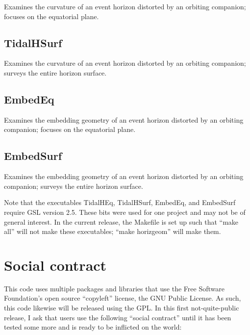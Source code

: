 \documentclass[11pt]{article}
\begin{document}
Examines the curvature of an event horizon distorted by an orbiting companion; focuses on the equatorial plane.

\subsection{TidalHSurf}

Examines the curvature of an event horizon distorted by an orbiting companion; surveys the entire horizon surface.

\subsection{EmbedEq}

Examines the embedding geometry of an event horizon distorted by an orbiting companion; focuses on the equatorial plane.

\subsection{EmbedSurf}

Examines the embedding geometry of an event horizon distorted by an orbiting companion; surveys the entire horizon surface.

Note that the executables TidalHEq, TidalHSurf, EmbedEq, and EmbedSurf require GSL version 2.5.  These bits were used for one project and may not be of general interest.  In the current release, the Makefile is set up such that ``make all'' will not make these executables; ``make horizgeom'' will make them.

\clearpage

\section*{Social contract}

This code uses multiple packages and libraries that use the Free Software Foundation's open source ``copyleft'' license, the GNU Public License.  As such, this code likewise will be released using the GPL.  In this first not-quite-public release, I ask that users use the following ``social contract'' until it has been tested some more and is ready to be inflicted on the world:
\end{document}

